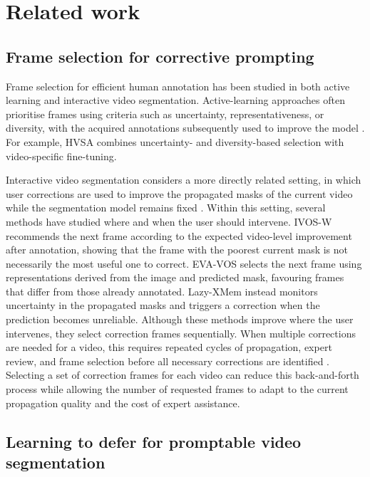 \section{Related work}

\subsection{Frame selection for corrective prompting}

Frame selection for efficient human annotation has been studied in both active learning and interactive video segmentation.
Active-learning approaches often prioritise frames using criteria such as uncertainty, representativeness, or diversity, with the acquired annotations subsequently used to improve the model \cite{vijayanarasimhan2012active, kuznetsova2021efficient, rana2022all}.
For example, HVSA \cite{hvsa} combines uncertainty- and diversity-based selection with video-specific fine-tuning.

Interactive video segmentation considers a more directly related setting, in which user corrections are used to improve the propagated masks of the current video while the segmentation model remains fixed \cite{yao2020video}.
Within this setting, several methods have studied where and when the user should intervene.
IVOS-W \cite{IVOSW} recommends the next frame according to the expected video-level improvement after annotation, showing that the frame with the poorest current mask is not necessarily the most useful one to correct.
EVA-VOS \cite{delatolas2024learning} selects the next frame using representations derived from the image and predicted mask, favouring frames that differ from those already annotated.
Lazy-XMem \cite{vujasinovic2024strike} instead monitors uncertainty in the propagated masks and triggers a correction when the prediction becomes unreliable.
Although these methods improve where the user intervenes, they select correction frames sequentially. When multiple corrections are needed for a video, this requires repeated cycles of propagation, expert review, and frame selection before all necessary corrections are identified \cite{delatolas2024learning}.
Selecting a set of correction frames for each video can reduce this back-and-forth process while allowing the number of requested frames to adapt to the current propagation quality and the cost of expert assistance.

\subsection{Learning to defer for promptable video segmentation}

